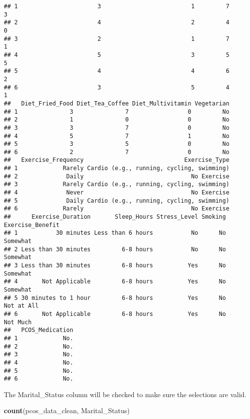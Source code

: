 \documentclass[
]{article}
\newenvironment{Shaded}{\begin{snugshade}}{\end{snugshade}}
\newcommand{\FunctionTok}[1]{\textcolor[rgb]{0.13,0.29,0.53}{\textbf{#1}}}
\newcommand{\NormalTok}[1]{#1}
\begin{document}
\begin{verbatim}
## 1                       3                          1         7           3
## 2                       4                          2         4           0
## 3                       2                          1         7           1
## 4                       5                          3         5           5
## 5                       4                          4         6           2
## 6                       3                          5         4           1
##   Diet_Fried_Food Diet_Tea_Coffee Diet_Multivitamin Vegetarian
## 1               3               7                 0         No
## 2               1               0                 0         No
## 3               3               7                 0         No
## 4               5               7                 1         No
## 5               3               5                 0         No
## 6               2               7                 0         No
##   Exercise_Frequency                             Exercise_Type
## 1             Rarely Cardio (e.g., running, cycling, swimming)
## 2              Daily                               No Exercise
## 3             Rarely Cardio (e.g., running, cycling, swimming)
## 4              Never                               No Exercise
## 5              Daily Cardio (e.g., running, cycling, swimming)
## 6             Rarely                               No Exercise
##      Exercise_Duration       Sleep_Hours Stress_Level Smoking Exercise_Benefit
## 1           30 minutes Less than 6 hours           No      No         Somewhat
## 2 Less than 30 minutes         6-8 hours           No      No         Somewhat
## 3 Less than 30 minutes         6-8 hours          Yes      No         Somewhat
## 4       Not Applicable         6-8 hours          Yes      No         Somewhat
## 5 30 minutes to 1 hour         6-8 hours          Yes      No       Not at All
## 6       Not Applicable         6-8 hours          Yes      No         Not Much
##   PCOS_Medication
## 1             No.
## 2             No.
## 3             No.
## 4             No.
## 5             No.
## 6             No.
\end{verbatim}

The Marital\_Status column will be checked to make sure the selections
are valid.

\begin{Shaded}
\begin{Highlighting}[]
\FunctionTok{count}\NormalTok{(pcos\_data\_clean, Marital\_Status)}
\end{Highlighting}
\end{Shaded}
\end{document}
